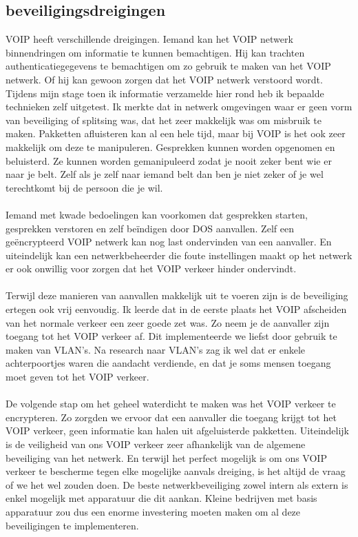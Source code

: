\documentclass[pdftex,a4paper,12pt,twoside]{report}
\begin{document}
\subsection{beveiligingsdreigingen}
VOIP heeft verschillende dreigingen. Iemand kan het VOIP netwerk binnendringen om informatie te kunnen bemachtigen. Hij kan trachten authenticatiegegevens te bemachtigen om zo gebruik te maken van het VOIP netwerk. Of hij kan gewoon zorgen dat het VOIP netwerk verstoord wordt. Tijdens mijn stage toen ik informatie verzamelde hier rond heb ik bepaalde technieken zelf uitgetest. Ik merkte dat in netwerk omgevingen waar er geen vorm van beveiliging of splitsing was, dat het zeer makkelijk was om misbruik te maken. Pakketten afluisteren kan al een hele tijd, maar bij VOIP is het ook zeer makkelijk om deze te manipuleren. Gesprekken kunnen worden opgenomen en beluisterd. Ze kunnen worden gemanipuleerd zodat je nooit zeker bent wie er naar je belt. Zelf als je zelf naar iemand belt dan ben je niet zeker of je wel terechtkomt bij de persoon die je wil. 
\\ \\
Iemand met kwade bedoelingen kan voorkomen dat gesprekken starten, gesprekken verstoren en zelf beïndigen door DOS aanvallen. Zelf een geëncrypteerd VOIP netwerk kan nog last ondervinden van een aanvaller. En uiteindelijk kan een netwerkbeheerder die foute instellingen maakt op het netwerk er ook onwillig voor zorgen dat het VOIP verkeer hinder ondervindt.
\\ \\
Terwijl deze manieren van aanvallen makkelijk uit te voeren zijn is de beveiliging ertegen ook vrij eenvoudig. Ik leerde dat in de eerste plaats het VOIP afscheiden van het normale verkeer een zeer goede zet was. Zo neem je de aanvaller zijn toegang tot het VOIP verkeer af. Dit implementeerde we liefst door gebruik te maken van VLAN's. Na research naar VLAN's zag ik wel dat er enkele achterpoortjes waren die aandacht verdiende, en dat je soms mensen toegang moet geven tot het VOIP verkeer. 
\\ \\
De volgende stap om het geheel waterdicht te maken was het VOIP verkeer te encrypteren. Zo zorgden we ervoor dat een aanvaller die toegang krijgt tot het VOIP verkeer, geen informatie kan halen uit afgeluisterde pakketten. 
\newpage
Uiteindelijk is de veiligheid van ons VOIP verkeer zeer afhankelijk van de algemene beveiliging van het netwerk. En terwijl het perfect mogelijk is om ons VOIP verkeer te bescherme tegen elke mogelijke aanvals dreiging, is het altijd de vraag of we het wel zouden doen. De beste netwerkbeveiliging zowel intern als extern is enkel mogelijk met apparatuur die dit aankan. Kleine bedrijven met basis apparatuur zou dus een enorme investering moeten maken om al deze beveiligingen te implementeren.\\
\end{document}
